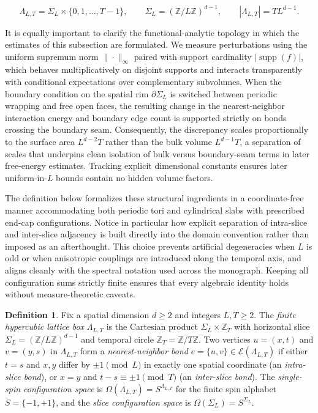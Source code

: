 \documentclass[11pt]{article}
\theoremstyle{definition}
\newtheorem{definition}[theorem]{Definition}
\begin{document}
\[
  \Lambda_{L,T} = \Sigma_L \times \{0, 1, \dots, T-1\}, \qquad \Sigma_L = (\mathbb{Z}/L\mathbb{Z})^{d-1}, \qquad |\Lambda_{L,T}| = T L^{d-1}.
\]

It is equally important to clarify the functional-analytic topology in which the
estimates of this subsection are formulated. We measure perturbations using the
uniform supremum norm $\|\cdot\|_\infty$ paired with support cardinality
$|\operatorname{supp}(f)|$, which behaves multiplicatively on disjoint supports and
interacts transparently with conditional expectations over complementary subvolumes.
When the boundary condition on the spatial rim $\partial \Sigma_L$ is switched
between periodic wrapping and free open faces, the resulting change in the
nearest-neighbor interaction energy and boundary edge count is supported strictly on
bonds crossing the boundary seam. Consequently, the discrepancy scales
proportionally to the surface area $L^{d-2} T$ rather than the bulk volume $L^{d-1}
T$, a separation of scales that underpins clean isolation of bulk versus
boundary-seam terms in later free-energy estimates. Tracking explicit dimensional
constants ensures later uniform-in-$L$ bounds contain no hidden volume factors.

The definition below formalizes these structural ingredients in a coordinate-free
manner accommodating both periodic tori and cylindrical slabs with prescribed
end-cap configurations. Notice in particular how explicit separation of intra-slice
and inter-slice adjacency is built directly into the domain convention rather than
imposed as an afterthought. This choice prevents artificial degeneracies when $L$ is
odd or when anisotropic couplings are introduced along the temporal axis, and aligns
cleanly with the spectral notation used across the monograph. Keeping all
configuration sums strictly finite ensures that every algebraic identity holds
without measure-theoretic caveats.

\begin{definition}
\label{def:s01-lattice}
Fix a spatial dimension $d \ge 2$ and integers $L, T \ge 2$. The \emph{finite
hypercubic lattice box} $\Lambda_{L,T}$ is the Cartesian product $\Sigma_L \times
\mathbb{Z}_T$ with horizontal slice $\Sigma_L = (\mathbb{Z}/L\mathbb{Z})^{d-1}$ and
temporal circle $\mathbb{Z}_T = \mathbb{Z}/T\mathbb{Z}$. Two vertices $u = (x, t)$
and $v = (y, s)$ in $\Lambda_{L,T}$ form a \emph{nearest-neighbor bond} $e = \{u,
v\} \in \mathcal{E}(\Lambda_{L,T})$ if either $t = s$ and $x, y$ differ by $\pm 1
\pmod{L}$ in exactly one spatial coordinate (an \emph{intra-slice bond}), or $x = y$
and $t - s \equiv \pm 1 \pmod{T}$ (an \emph{inter-slice bond}). The
\emph{single-spin configuration space} is $\Omega(\Lambda_{L,T}) =
S^{\Lambda_{L,T}}$ for the finite spin alphabet $S = \{-1, +1\}$, and the
\emph{slice configuration space} is $\Omega(\Sigma_L) = S^{\Sigma_L}$.
\end{definition}
\end{document}
